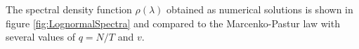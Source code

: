 \documentclass{article}
\begin{document}
The spectral density function $\rho(\lambda)$ obtained as numerical
solutions is shown in figure \ref{fig:LognormalSpectra} and compared
to the Marcenko-Pastur law with several values of $q = N/T$ and $v$.
\begin{figure}[htb!]
  \centering
  \subfigure[$q = 0.5$]{
}
\end{figure}
\end{document}
